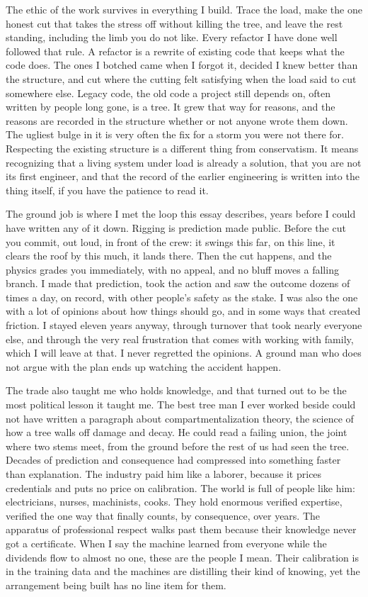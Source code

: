 \documentclass[11pt]{article}
\begin{document}
The ethic of the work survives in everything I build. Trace the load, make the one honest cut that takes the stress off without killing the tree, and leave the rest standing, including the limb you do not like. Every refactor I have done well followed that rule. A refactor is a rewrite of existing code that keeps what the code does. The ones I botched came when I forgot it, decided I knew better than the structure, and cut where the cutting felt satisfying when the load said to cut somewhere else. Legacy code, the old code a project still depends on, often written by people long gone, is a tree. It grew that way for reasons, and the reasons are recorded in the structure whether or not anyone wrote them down. The ugliest bulge in it is very often the fix for a storm you were not there for. Respecting the existing structure is a different thing from conservatism. It means recognizing that a living system under load is already a solution, that you are not its first engineer, and that the record of the earlier engineering is written into the thing itself, if you have the patience to read it.

The ground job is where I met the loop this essay describes, years before I could have written any of it down. Rigging is prediction made public. Before the cut you commit, out loud, in front of the crew: it swings this far, on this line, it clears the roof by this much, it lands there. Then the cut happens, and the physics grades you immediately, with no appeal, and no bluff moves a falling branch. I made that prediction, took the action and saw the outcome dozens of times a day, on record, with other people's safety as the stake. I was also the one with a lot of opinions about how things should go, and in some ways that created friction. I stayed eleven years anyway, through turnover that took nearly everyone else, and through the very real frustration that comes with working with family, which I will leave at that. I never regretted the opinions. A ground man who does not argue with the plan ends up watching the accident happen.

The trade also taught me who holds knowledge, and that turned out to be the most political lesson it taught me. The best tree man I ever worked beside could not have written a paragraph about compartmentalization theory, the science of how a tree walls off damage and decay. He could read a failing union, the joint where two stems meet, from the ground before the rest of us had seen the tree. Decades of prediction and consequence had compressed into something faster than explanation. The industry paid him like a laborer, because it prices credentials and puts no price on calibration. The world is full of people like him: electricians, nurses, machinists, cooks. They hold enormous verified expertise, verified the one way that finally counts, by consequence, over years. The apparatus of professional respect walks past them because their knowledge never got a certificate. When I say the machine learned from everyone while the dividends flow to almost no one, these are the people I mean. Their calibration is in the training data and the machines are distilling their kind of knowing, yet the arrangement being built has no line item for them.
\end{document}
